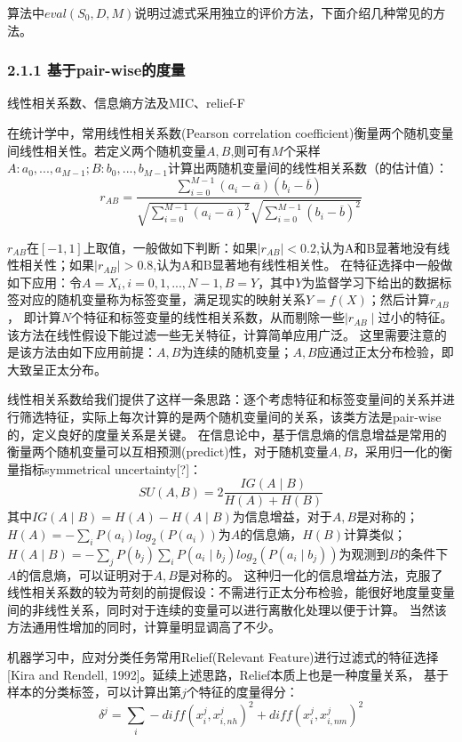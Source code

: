 \documentclass[a4paper,UTF8]{article}
\begin{document}
  算法中$ eval(S_{0}, D, M)$说明过滤式采用独立的评价方法，下面介绍几种常见的方法。

\subsubsection*{2.1.1 基于pair-wise的度量}
  线性相关系数、信息熵方法及MIC、relief-F

  在统计学中，常用线性相关系数(Pearson correlation coefficient)衡量两个随机变量间线性相关性。若定义两个随机变量$ A, B $,则可有$M$个采样
  $ A: a_{0},...,a_{M-1}; B: b_{0},...,b_{M-1}$计算出两随机变量间的线性相关系数（的估计值）：
  $$  r_{AB} = \frac{\sum_{i=0}^{M-1}(a_{i}-\overline{a})(b_{i}-\overline{b})}{\sqrt{\sum_{i=0}^{M-1}(a_{i}-\overline{a})^2}\sqrt{\sum_{i=0}^{M-1}(b_{i}-\overline{b})^2}}$$

  $ r_{AB} $在$ [-1,1]$上取值，一般做如下判断：如果$ \mid{r_{AB}}\mid<0.2$,认为A和B显著地没有线性相关性；如果$ \mid{r_{AB}}\mid>0.8$,认为A和B显著地有线性相关性。
  在特征选择中一般做如下应用：令$ A=X_{i},i=0,1,...,N-1, B=Y$，其中$Y$为监督学习下给出的数据标签对应的随机变量称为标签变量，满足现实的映射关系$Y=f(X)$；然后计算$ r_{AB} $，
  即计算$N$个特征和标签变量的线性相关系数，从而剔除一些$\mid{r_{AB}}\mid$过小的特征。该方法在线性假设下能过滤一些无关特征，计算简单应用广泛。
  这里需要注意的是该方法由如下应用前提：$A,B$为连续的随机变量；$A,B$应通过正太分布检验，即大致呈正太分布。

  线性相关系数给我们提供了这样一条思路：逐个考虑特征和标签变量间的关系并进行筛选特征，实际上每次计算的是两个随机变量间的关系，该类方法是pair-wise的，定义良好的度量关系是关键。
  在信息论中，基于信息熵的信息增益是常用的衡量两个随机变量可以互相预测(predict)性，对于随机变量$ A, B $，采用归一化的衡量指标symmetrical uncertainty[?]：
  $$ SU(A, B) = 2 \frac{IG(A \mid B)}{H(A)+H(B)} $$
  其中$IG(A \mid B)=H(A)-H(A \mid B)$为信息增益，对于$A,B$是对称的；$H(A)=-\sum_{i}P(a_{i})log_{2}(P(a_{i}))$为$A$的信息熵，$H(B)$计算类似；
  $H(A \mid B)=-\sum_{j}P(b_{j})\sum_{i}P(a_{i} \mid b_{j})log_{2}(P(a_{i} \mid b_{j}))$为观测到$B$的条件下$A$的信息熵，可以证明对于$A,B$是对称的。
  这种归一化的信息增益方法，克服了线性相关系数的较为苛刻的前提假设：不需进行正太分布检验，能很好地度量变量间的非线性关系，同时对于连续的变量可以进行离散化处理以便于计算。
  当然该方法通用性增加的同时，计算量明显调高了不少。

  机器学习中，应对分类任务常用Relief(Relevant Feature)进行过滤式的特征选择[Kira and Rendell, 1992]。延续上述思路，Relief本质上也是一种度量关系，
  基于样本的分类标签，可以计算出第$j$个特征的度量得分：
  $$ \delta^{j}=\sum_{i}-diff(x_{i}^{j},x_{i,nh}^{j})^{2}+diff(x_{i}^{j},x_{i,nm}^{j})^{2} $$
\end{document}
